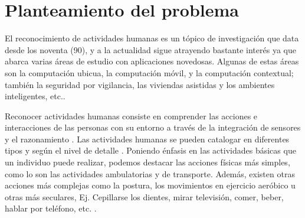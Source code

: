 \section{Planteamiento del problema}

\label{sec11:planteamiento}El reconocimiento de actividades humanas
es un tópico de investigación que data desde los noventa (90), y a
la actualidad sigue atrayendo bastante interés ya que abarca varias
áreas de estudio con aplicaciones novedosas. Algunas de estas áreas
son la computación ubicua, la computación móvil, y la computación
contextual; también la seguridad por vigilancia, las viviendas asistidas
y los ambientes inteligentes, etc.\cite{Chen2012}. 

Reconocer actividades humanas consiste en comprender las acciones
e interacciones de las personas con su entorno a través de la integración
de sensores y el razonamiento \cite{ReyesOrtiz2015}. Las actividades
humanas se pueden catalogar en diferentes tipos y según el nivel de
detalle \cite{Chen2012}. Poniendo énfasis en las actividades básicas
que un individuo puede realizar, podemos destacar las acciones físicas
más simples, como lo son las actividades ambulatorias y de transporte.
Además, existen otras acciones más complejas como la postura, los
movimientos en ejercicio aeróbico u otras más seculares, Ej. Cepillarse
los dientes, mirar televisión, comer, beber, hablar por teléfono,
etc. \cite{LaraLabrador2013}.

